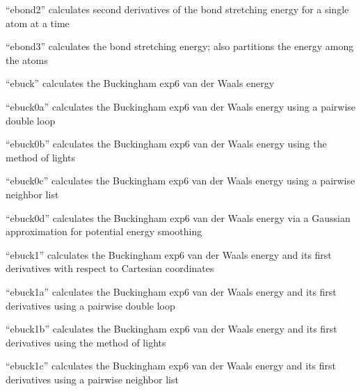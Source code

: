 \documentclass[letterpaper,11pt,english]{sphinxmanual}
\begin{document}

“ebond2” calculates second derivatives of the bond
stretching energy for a single atom at a time


“ebond3” calculates the bond stretching energy; also
partitions the energy among the atoms


“ebuck” calculates the Buckingham exp\sphinxhyphen{}6 van der Waals energy


“ebuck0a” calculates the Buckingham exp\sphinxhyphen{}6 van der Waals energy
using a pairwise double loop


“ebuck0b” calculates the Buckingham exp\sphinxhyphen{}6 van der Waals energy
using the method of lights


“ebuck0c” calculates the Buckingham exp\sphinxhyphen{}6 van der Waals energy
using a pairwise neighbor list


“ebuck0d” calculates the Buckingham exp\sphinxhyphen{}6 van der Waals energy
via a Gaussian approximation for potential energy smoothing


“ebuck1” calculates the Buckingham exp\sphinxhyphen{}6 van der Waals energy
and its first derivatives with respect to Cartesian coordinates


“ebuck1a” calculates the Buckingham exp\sphinxhyphen{}6 van der Waals energy
and its first derivatives using a pairwise double loop


“ebuck1b” calculates the Buckingham exp\sphinxhyphen{}6 van der Waals energy
and its first derivatives using the method of lights


“ebuck1c” calculates the Buckingham exp\sphinxhyphen{}6 van der Waals energy
and its first derivatives using a pairwise neighbor list

\end{document}
